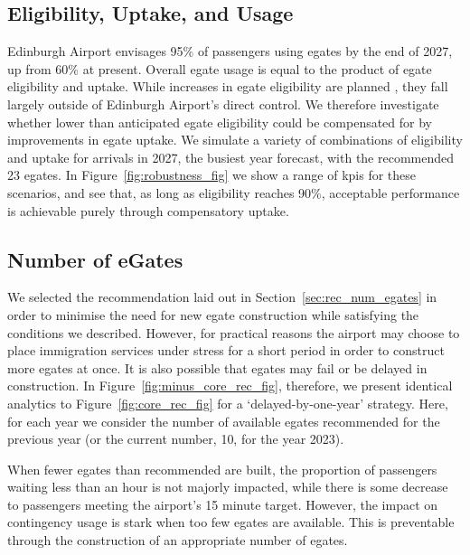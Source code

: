 \documentclass[10pt]{article}
\begin{document}
\subsection{Eligibility, Uptake, and Usage}
Edinburgh Airport envisages 95\% of passengers using \glspl{egate} by the end of 2027, up from 60\% at present. Overall \gls{egate} usage is equal to the product of \gls{egate} eligibility and uptake. While increases in \gls{egate} eligibility are planned \cite{UK_border_2025}, they fall largely outside of Edinburgh Airport's direct control. We therefore investigate whether lower than anticipated \gls{egate} eligibility could be compensated for by improvements in \gls{egate} uptake. We simulate a variety of combinations of eligibility and uptake for arrivals in 2027, the busiest year forecast, with the recommended 23 \glspl{egate}. In Figure~\ref{fig:robustness_fig} we show a range of \glspl{kpi} for these scenarios, and see that, as long as eligibility reaches 90\%, acceptable performance is achievable purely through compensatory uptake.






\subsection{Number of eGates}
We selected the recommendation laid out in Section~\ref{sec:rec_num_egates} in order to minimise the need for new \gls{egate} construction while satisfying the conditions we described. However, for practical reasons the airport may choose to place immigration services under stress for a short period in order to construct more \glspl{egate} at once. It is also possible that \glspl{egate} may fail or be delayed in construction. In Figure~\ref{fig:minus_core_rec_fig}, therefore, we present identical analytics to Figure~\ref{fig:core_rec_fig} for a `delayed-by-one-year' strategy. Here, for each year we consider the number of available \glspl{egate} recommended for the previous year (or the current number, 10, for the year 2023).



 When fewer \glspl{egate} than recommended are built, the proportion of passengers waiting less than an hour is not majorly impacted, while there is some decrease to passengers meeting the airport's 15 minute target.  However, the impact on contingency usage is stark when too few \glspl{egate} are available. This is preventable through the construction of an appropriate number of \glspl{egate}.
\end{document}
